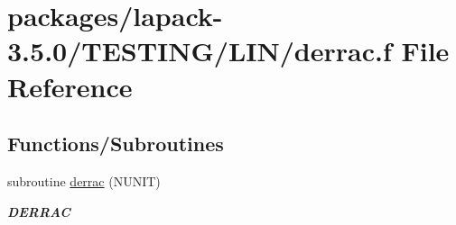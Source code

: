 \hypertarget{derrac_8f}{}\section{packages/lapack-\/3.5.0/\+T\+E\+S\+T\+I\+N\+G/\+L\+I\+N/derrac.f File Reference}
\label{derrac_8f}
\subsection*{Functions/\+Subroutines}
\begin{DoxyCompactItemize}
\item 
subroutine \hyperlink{group__double__lin_ga668ad472fc12d63dd57d3266e471c2cd}{derrac} (N\+U\+N\+I\+T)
\begin{DoxyCompactList}\small\item\em {\bfseries D\+E\+R\+R\+A\+C} \end{DoxyCompactList}\end{DoxyCompactItemize}
